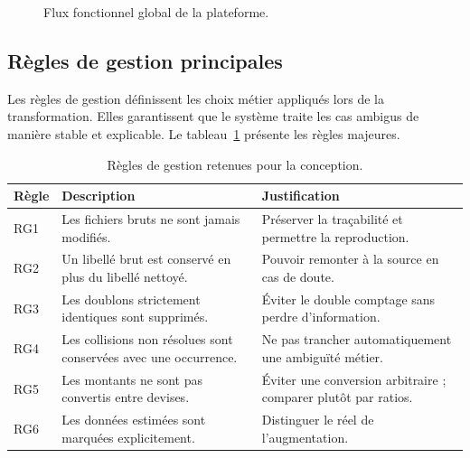 \begin{figure}[H]
\centering
{}
\caption[Flux fonctionnel global]{Flux fonctionnel global de la plateforme.}
\label{fig:fluxfonctionnel}
\end{figure}

\subsection{Règles de gestion principales}
\par Les règles de gestion définissent les choix métier appliqués lors de la
transformation. Elles garantissent que le système traite les cas ambigus de
manière stable et explicable. Le tableau~\ref{tab:reglesgestion} présente les
règles majeures.

\begin{table}[H]
\centering
\caption[Règles de gestion principales]{Règles de gestion retenues pour la conception.}
\label{tab:reglesgestion}
\begin{tabularx}{\linewidth}{|p{2cm}|X|X|}
\hline
\textbf{Règle} & \textbf{Description} & \textbf{Justification} \\ \hline
RG1 & Les fichiers bruts ne sont jamais modifiés. & Préserver la traçabilité et permettre la reproduction. \\ \hline
RG2 & Un libellé brut est conservé en plus du libellé nettoyé. & Pouvoir remonter à la source en cas de doute. \\ \hline
RG3 & Les doublons strictement identiques sont supprimés. & Éviter le double comptage sans perdre d'information. \\ \hline
RG4 & Les collisions non résolues sont conservées avec une occurrence. & Ne pas trancher automatiquement une ambiguïté métier. \\ \hline
RG5 & Les montants ne sont pas convertis entre devises. & Éviter une conversion arbitraire ; comparer plutôt par ratios. \\ \hline
RG6 & Les données estimées sont marquées explicitement. & Distinguer le réel de l'augmentation. \\ \hline
\end{tabularx}
\end{table}

